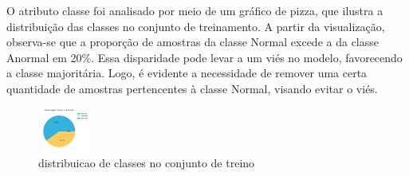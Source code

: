 \documentclass[10pt, conference, compsocconf]{IEEEtran}
\begin{document}
O atributo classe foi analisado por meio de um gráfico de pizza, que ilustra a distribuição das classes no conjunto de treinamento. 
A partir da visualização, observa-se que a proporção de amostras da classe Normal excede a da classe Anormal em 20\%. 
Essa disparidade pode levar a um viés no modelo, favorecendo a classe majoritária. Logo, é evidente a necessidade de remover uma 
certa quantidade de amostras pertencentes à classe Normal, visando evitar o viés.

\begin{figure}[htbp]
  \centering
  \includegraphics[width=0.15\textwidth]{distribuicao_classe.png}
  \tiny{\caption{distribuicao de classes no conjunto de treino}}
  \label{fig:classe}
\end{figure}
\end{document}
